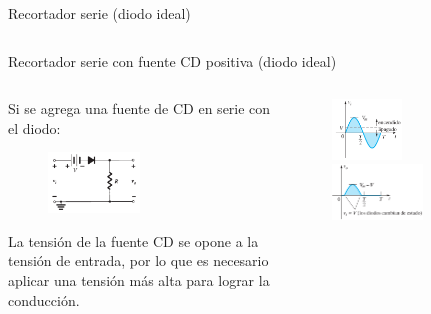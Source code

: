 \documentclass[t,aspectratio=169]{beamer}
\begin{document}
\begin{frame}{Recortador serie (diodo ideal)}
\begin{columns}
\begin{column}{0.5\textwidth}
\end{column}
\end{columns}

\end{frame}


\begin{frame}{Recortador serie con fuente CD positiva (diodo ideal)}

\begin{columns}
\begin{column}{0.5\textwidth}

Si se agrega una fuente de CD en serie con el diodo:

\begin{figure}
    \centering
    \includegraphics[width=0.5\textwidth]{figures/recortador_serie_ideal_fuente_circuito.png}
\end{figure}

La tensión de la fuente CD se opone a la tensión de entrada, por lo que es necesario aplicar una tensión más alta para lograr la conducción.

\end{column}
\begin{column}{0.5\textwidth}

\begin{figure}
    \flushleft
    \includegraphics[width=0.5\textwidth]{figures/recortador_serie_ideal_fuente_1.png}
    \includegraphics[width=0.65\textwidth]{figures/recortador_serie_ideal_fuente_2.png}
\end{figure}


\end{column}
\end{columns}
\end{frame}
\end{document}
